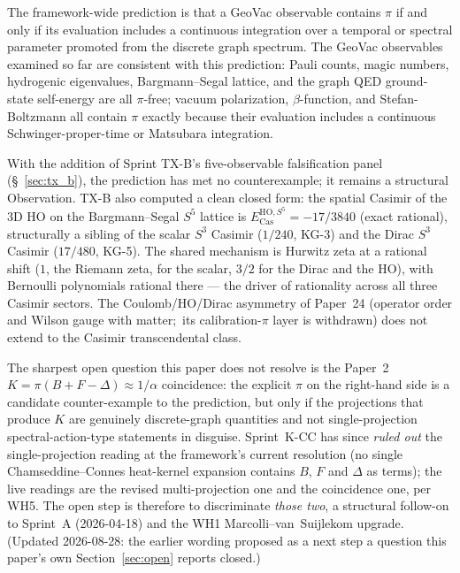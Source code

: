 \documentclass[11pt]{article}
\begin{document}
The framework-wide prediction is that a GeoVac observable contains
$\pi$ if and only if its evaluation includes a continuous integration
over a temporal or spectral parameter promoted from the discrete graph
spectrum.  The GeoVac observables examined so far are consistent
with this prediction: Pauli counts, magic numbers, hydrogenic eigenvalues,
Bargmann--Segal lattice, and the graph QED ground-state self-energy are all
$\pi$-free; vacuum polarization, $\beta$-function, and Stefan-Boltzmann
all contain $\pi$ exactly because their evaluation includes a
continuous Schwinger-proper-time or Matsubara integration.

With the addition of Sprint TX-B's five-observable falsification
panel (\S~\ref{sec:tx_b}), the prediction has met no counterexample;
it remains a structural Observation.  TX-B also computed a clean
closed form: the spatial Casimir of the 3D HO on the Bargmann--Segal
$S^5$ lattice is $E_\text{Cas}^{\text{HO}, S^5} = -17/3840$ (exact
rational), structurally a sibling of the scalar $S^3$ Casimir
($1/240$, KG-3) and the Dirac $S^3$ Casimir ($17/480$, KG-5).
The shared mechanism is Hurwitz zeta at a rational shift ($1$, the
Riemann zeta, for the scalar, $3/2$ for the Dirac and the HO), with Bernoulli polynomials
rational there --- the driver of rationality across all three Casimir
sectors.  The Coulomb/HO/Dirac
asymmetry of Paper~24 (operator order and Wilson gauge with matter;\ its
calibration-$\pi$ layer is withdrawn) does not extend to the Casimir transcendental
class.

The sharpest open question this paper does not resolve is the Paper~2
$K = \pi(B + F - \Delta) \approx 1/\alpha$ coincidence: the explicit
$\pi$ on the right-hand side is a candidate counter-example to the
prediction, but only if the projections that produce $K$ are genuinely
discrete-graph quantities and not single-projection
spectral-action-type statements in disguise.  Sprint~K-CC has since
\emph{ruled out} the single-projection reading at the framework's
current resolution (no single Chamseddine--Connes heat-kernel
expansion contains $B$, $F$ and $\Delta$ as terms); the live readings
are the revised multi-projection one and the coincidence one, per
WH5.  The open step is therefore to discriminate \emph{those two},
a structural follow-on to Sprint~A (2026-04-18) and the WH1
Marcolli--van~Suijlekom upgrade.  (Updated 2026-08-28: the earlier
wording proposed as a next step a question this paper's own
Section~\ref{sec:open} reports closed.)
\end{document}
